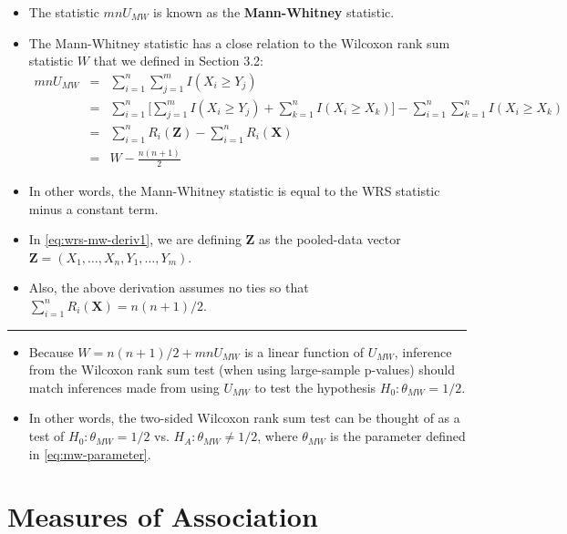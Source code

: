 \documentclass[]{book}
\begin{document}
\begin{itemize}
\item
  The statistic \(mn U_{MW}\) is known as the \textbf{Mann-Whitney} statistic.
\item
  The Mann-Whitney statistic has a close relation to the Wilcoxon
  rank sum statistic \(W\) that we defined in Section 3.2:
  \begin{eqnarray}
  mn U_{MW} &=& 
  \sum_{i=1}^{n}\sum_{j=1}^{m} I( X_{i} \geq Y_{j}) \nonumber \\
  &=& \sum_{i=1}^{n}\Big[ \sum_{j=1}^{m} I( X_{i} \geq Y_{j}) +
  \sum_{k=1}^{n} I( X_{i} \geq X_{k}) \Big] -
  \sum_{i=1}^{n}\sum_{k=1}^{n} I( X_{i} \geq X_{k}) \nonumber \\
  &=& \sum_{i=1}^{n} R_{i}(\mathbf{Z}) -
  \sum_{i=1}^{n} R_{i}( \mathbf{X} ) \label{eq:wrs-mw-deriv1}  \\
  &=& W - \frac{n(n+1)}{2} \nonumber
  \end{eqnarray}
\item
  In other words, the Mann-Whitney statistic is equal to
  the WRS statistic minus a constant term.
\item
  In \eqref{eq:wrs-mw-deriv1}, we are defining \(\mathbf{Z}\) as
  the pooled-data vector \(\mathbf{Z} = (X_{1}, \ldots, X_{n}, Y_{1}, \ldots, Y_{m})\).
\item
  Also, the above derivation assumes no ties so that
  \(\sum_{i=1}^{n} R_{i}( \mathbf{X} ) = n(n+1)/2\).
\end{itemize}

\begin{center}\rule{0.5\linewidth}{\linethickness}\end{center}

\begin{itemize}
\item
  Because \(W = n(n+1)/2 + mn U_{MW}\) is a linear function of \(U_{MW}\),
  inference from the Wilcoxon rank sum test (when using large-sample p-values)
  should match inferences made from using \(U_{MW}\) to test the hypothesis \(H_{0}: \theta_{MW} = 1/2\).
\item
  In other words, the two-sided Wilcoxon rank sum test can
  be thought of as a test of \(H_{0}: \theta_{MW} = 1/2\) vs. \(H_{A}:\theta_{MW} \neq 1/2\),
  where \(\theta_{MW}\) is the parameter defined in \eqref{eq:mw-parameter}.
\end{itemize}

\hypertarget{measures-of-association}{%
\section{Measures of Association}\label{measures-of-association}}
\end{document}
